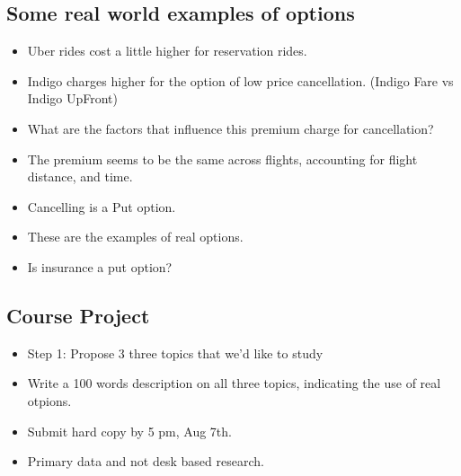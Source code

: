 \documentclass{article}
\begin{document}
\subsection{Some real world examples of options}
\begin{itemize}
    \item Uber rides cost a little higher for reservation rides.
    \item Indigo charges higher for the option of low price cancellation. (Indigo Fare vs Indigo UpFront)
    \item What are the factors that influence this premium charge for cancellation?
    \item The premium seems to be the same across flights, accounting for flight distance, and time.
    \item Cancelling is a Put option.
    \item These are the examples of real options.
    \item Is insurance a put option?
\end{itemize}


\subsection{Course Project}
\begin{itemize}
    \item Step 1: Propose 3 three topics that we'd like to study
    \item Write a 100 words description on all three topics, indicating the use of real otpions.
    \item Submit hard copy by 5 pm, Aug 7th.
    \item Primary data and not desk based research.
\end{itemize}
\end{document}
